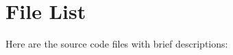 \section{File List}
Here are the source code files with brief descriptions\-:\begin{DoxyCompactList}
\item{}
\end{DoxyCompactList}
